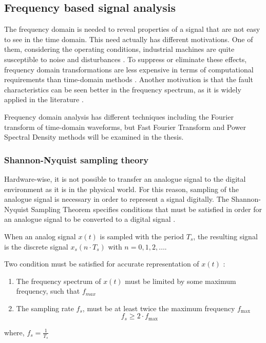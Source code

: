 \subsection{Frequency based signal analysis}

The frequency domain is needed to reveal properties of a signal that are not easy to see in the time domain. This need actually has different motivations. One of them, considering the operating conditions, industrial machines are quite susceptible to noise and disturbances \cite{cernuda2019relevance,allen2004signal}. To suppress or eliminate these effects, frequency domain transformations are less expensive in terms of computational requirements than time-domain methods \cite{ahmed2019condition,cernuda2019relevance}. Another motivation is that the fault characteristics can be seen better in the frequency spectrum, as it is widely applied in the literature \cite{ahmed2019condition}.

Frequency domain analysis has different techniques including the Fourier transform of time-domain waveforms, but Fast Fourier Transform and Power Spectral Density methods will be examined in the thesis.

\subsubsection{Shannon-Nyquist sampling theory}

Hardware-wise, it is not possible to transfer an analogue signal to the digital environment as it is in the physical world. For this reason, sampling of the analogue signal is necessary in order to represent a signal digitally. The Shannon-Nyquist Sampling Theorem specifies conditions that must be satisfied in order for an analogue signal to be converted to a digital signal \cite{orfanidis1995introduction}. 

When an analog signal $x(t)$ is sampled with the period $T_s$, the resulting signal is the discrete signal $x_s(n\cdot T_s)$ with $n=0,1,2,\ldots$. 

Two condition must be satisfied for accurate representation of $x(t)$ \cite{orfanidis1995introduction}:
\begin{enumerate}
	\item The frequency spectrum of $x(t)$ must be limited by some maximum frequency, such that $f_{max}$ 
	\item The sampling rate $f_{s}$, must be at least twice the maximum frequency $f_{\max }$
	$$
	f_{s} \geq 2\cdot f_{\max }
	$$
\end{enumerate}
where, $f_s = \displaystyle\frac{1}{T_s}$
\pagebreak
